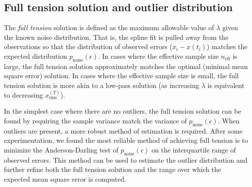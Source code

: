 \documentclass{ametsoc}
\begin{document}


\subsection{Full tension solution and outlier distribution}
\label{subsec:full_tension}

The \emph{full tension} solution is defined as the maximum allowable value of $\lambda$ given the known noise distribution. That is, the spline fit is pulled away from the observations so that the distribution of observed errors ($x_i-x(t_i)$) matches the expected distribution $p_{\textrm{noise}}(\epsilon)$. In cases where the effective sample size $n_\textrm{eff}$ is large, the full tension solution approximately matches the optimal (minimal mean square error) solution. In cases where the effective sample size is small, the full tension solution is more akin to a low-pass solution (as increasing $\lambda$ is equivalent to decreasing $x^{(T)}_\textrm{rms}$).

In the simplest case where there are no outliers, the full tension solution can be found by requiring the sample variance match the variance of $p_{\textrm{noise}}(\epsilon)$. When outliers are present, a more robust method of estimation is required. After some experimentation, we found the most reliable method of achieving full tension is to minimize the Anderson-Darling test of $p_{\textrm{noise}}(\epsilon)$ on the interquartile range of observed errors. This method can be used to estimate the outlier distribution and further refine both the full tension solution and the range over which the expected mean square error is computed.
\end{document}

